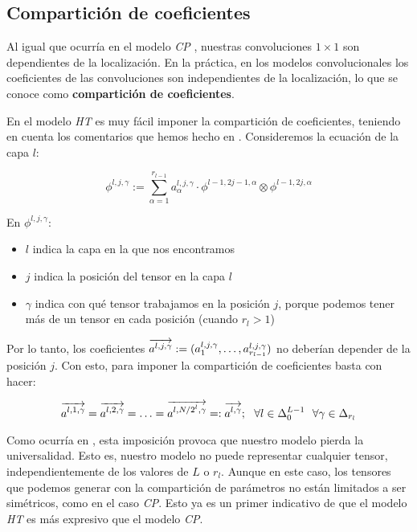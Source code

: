 \subsection{Compartición de coeficientes}

Al igual que ocurría en el modelo \textit{CP} , nuestras convoluciones $1 \times 1$ son dependientes de la localización. En la práctica, en los modelos convolucionales los coeficientes de las convoluciones son independientes de la localización, lo que se conoce como \textbf{compartición de coeficientes}.

En el modelo \textit{HT} es muy fácil imponer la compartición de coeficientes, teniendo en cuenta los comentarios que hemos hecho en . Consideremos la ecuación de la capa $l$:

\begin{equation}
    \phi^{l, j, \gamma} := \sum_{\alpha = 1}^{r_{l-1}} a_{\alpha}^{l, j, \gamma} \cdot \phi^{l-1, 2j-1, \alpha} \otimes \phi^{l-1, 2j, \alpha}
\end{equation}

En $\phi^{l, j, \gamma}$:

\begin{itemize}
    \item $l$ indica la capa en la que nos encontramos
    \item $j$ indica la posición del tensor en la capa $l$
    \item $\gamma$ indica con qué tensor trabajamos en la posición $j$, porque podemos tener más de un tensor en cada posición (cuando $r_l > 1$)
\end{itemize}

Por lo tanto, los coeficientes $\overrightarrow{a^{l, j, \gamma}} := (a^{l, j, \gamma}_1, \ldots, a^{l, j, \gamma}_{r_{l-1}})$ no deberían depender de la posición $j$. Con esto, para imponer la compartición de coeficientes basta con hacer:

\begin{equation}
    \overrightarrow{a^{l, 1, \gamma}} = \overrightarrow{a^{l, 2, \gamma}} = \ldots = \overrightarrow{a^{l, N/2^l, \gamma}} =: \overrightarrow{a^{l, \gamma}}; \ \  \forall l \in \Delta_{0}^{L - 1} \ \  \forall \gamma \in \Delta_{r_l}
\end{equation}

Como ocurría en , esta imposición provoca que nuestro modelo pierda la universalidad. Esto es, nuestro modelo no puede representar cualquier tensor, independientemente de los valores de $L$ o $r_l$. Aunque en este caso, los tensores que podemos generar con la compartición de parámetros no están limitados a ser simétricos, como en el caso \textit{CP}. Esto ya es un primer indicativo de que el modelo \textit{HT} es más expresivo que el modelo \textit{CP}.

